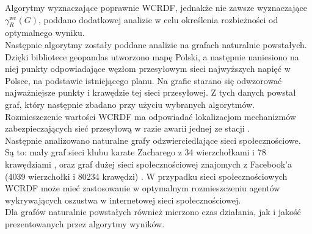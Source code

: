 Algorytmy wyznaczające poprawnie WCRDF, jednakże nie zawsze wyznaczające $\gamma_{R}^{\text{wc}}(G)$, poddano dodatkowej analizie w celu określenia rozbieżności od optymalnego wyniku.\\

Następnie algorytmy zostały poddane analizie na grafach naturalnie powstałych.
Dzięki bibliotece geopandas utworzono mapę Polski, a następnie naniesiono na niej punkty odpowiadające węzłom przesyłowym sieci najwyższych napięć w Polsce, na podstawie istniejącego planu. Na grafie starano się odwzorować najważniejsze punkty i krawędzie tej sieci przesyłowej. Z tych danych powstał graf, który następnie zbadano przy użyciu wybranych algorytmów. Rozmieszczenie wartości WCRDF ma odpowiadać lokalizacjom mechanizmów zabezpieczających sieć przesyłową w razie awarii jednej ze stacji \cite{POLAND}.\\

Następnie analizowano naturalne grafy odzwierciedlające sieci społecznościowe. Są to: mały graf sieci klubu karate Zacharego z 34 wierzchołkami i 78 krawędziami \cite{KARATE}, oraz graf dużej sieci społecznościowej znajomych z Facebook'a (4039 wierzchołki i 80234 krawędzi) \cite{FACEBOOK}. W przypadku sieci społecznościowych WCRDF może mieć zastosowanie w optymalnym rozmieszczeniu agentów wykrywających oszustwa w internetowej sieci społecznościowej.\\

Dla grafów naturalnie powstałych również mierzono czas działania, jak i jakość prezentowanych przez algorytmy wyników.



